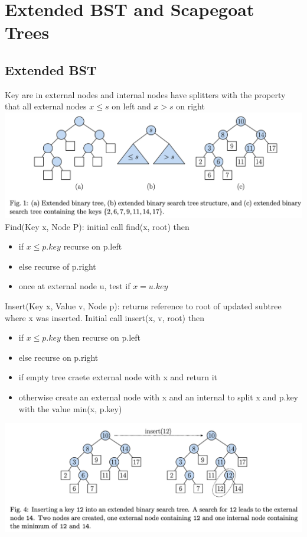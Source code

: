 \documentclass{article}
\begin{document}
  \section{Extended BST and Scapegoat Trees}
  \subsection{Extended BST}
  Key are in external nodes and internal nodes have splitters with the property that all external nodes $x \leq s$ on left and $x > s$ on right\\
  \includegraphics[width=\textwidth]{ExtendedBST}
  Find(Key x, Node P): initial call find(x, root) then 
  \begin{itemize}[noitemsep]
    \item if $x \leq p.key$ recurse on p.left
    \item else recurse of p.right
    \item once at external node u, test if $x = u.key$ \\
  \end{itemize}
  Insert(Key x, Value v, Node p): returns reference to root of updated subtree where x was inserted. Initial call insert(x, v, root) then
  \begin{itemize}
    \item if $x \leq p.key$ then recurse on p.left
    \item else recurse on p.right
    \item if empty tree craete external node with x and return it
    \item otherwise create an external node with x and an internal to split x and p.key with the value min(x, p.key)
  \end{itemize}
  \includegraphics[width=\textwidth]{ExtendedBSTInsert}
\end{document}
